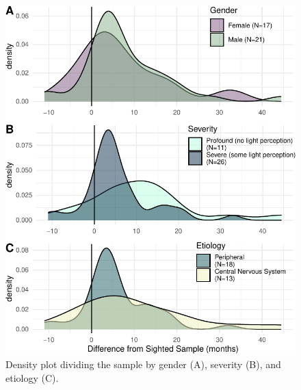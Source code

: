 \documentclass[
  man,floatsintext]{apa6}
\begin{document}
\begin{figure}
\centering
\includegraphics{VI_CDI_manuscript_files/figure-latex/splitting-tests-1.pdf}
\caption{\label{fig:splitting-tests}Density plot dividing the sample by gender (A), severity (B), and etiology (C).}
\end{figure}
\end{document}
